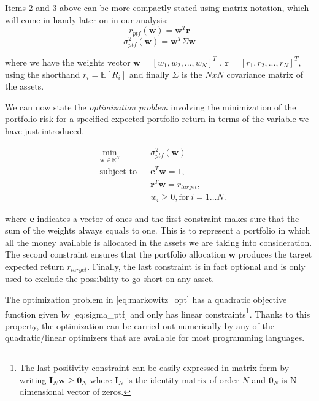Items 2 and 3 above can be more compactly stated using matrix notation, which will come in handy later on in our analysis:
\begin{equation}
\label{eq:ptf_return}
r_{ptf}(\mathbf{w}) = \mathbf{w}^T \mathbf{r}
\end{equation}
\begin{equation}
\label{eq:sigma_ptf}
	\sigma^2_{ptf}(\mathbf{w}) =  \mathbf{w}^T \Sigma \mathbf{w}
\end{equation}

where we have the weights vector $\mathbf{w} = [w_1, w_2, ... , w_N]^T$ , $\mathbf{r} = [r_1, r_2, ... , r_N]^T$, using the shorthand $r_i = \mathbb{E}[R_i]$ and finally $\Sigma$ is the $NxN$ covariance matrix of the assets.

\bigskip

We can now state the \textit{optimization problem} involving the minimization of the portfolio risk for a specified expected portfolio return in terms of the variable we have just introduced.

\begin{subequations}
	\label{eq:markowitz_opt}
	\begin{align}
	&\!\min_{\mathbf{w}\in \mathbb{R}^{N}}     &    & \sigma^2_{ptf}(\mathbf{w}) \\
	& \text{subject to}   &   & \mathbf{e}^T\mathbf{w} = 1 ,\\
	&                 &       & \mathbf{r}^T\mathbf{w} = r_{target},\label{eq:constraint2} \\
	&		   &      & w_{i} \geq 0, \text{for} \: i = 1\dots N. 
	\end{align}
\end{subequations}

where \textbf{e} indicates a vector of ones and the first constraint makes sure that the sum of the weights always equals to one. This is to represent a portfolio in which all the money available is allocated in the assets we are taking into consideration.
The second constraint ensures that the portfolio allocation $\mathbf{w}$ produces the target expected return $r_{target}$.
Finally, the last constraint is in fact optional and is only used to exclude the possibility to go short on any asset.

The optimization problem in \eqref{eq:markowitz_opt} has a quadratic objective function given by \eqref{eq:sigma_ptf} and only has linear constraints\footnote{The last positivity constraint can be easily expressed in matrix form by writing $ \mathbf{I}_N\mathbf{w} \geq \mathbf{0}_N$ where $\mathbf{I}_N$ is the identity matrix of order $N$ and $\mathbf{0}_N$ is N-dimensional vector of zeros.}. Thanks to this property, the optimization can be carried out numerically by any of the quadratic/linear optimizers that are available for most programming languages.

